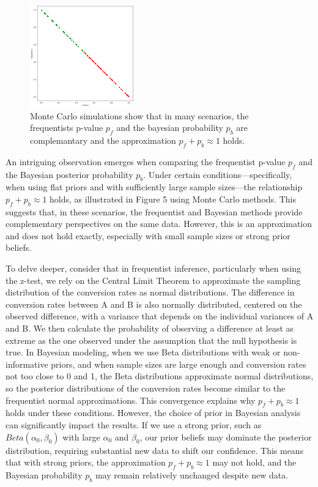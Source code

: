 \documentclass[final,5p,times,twocolumn,authoryear]{elsarticle}
\begin{document}
\begin{figure}[h]
  \centering 
  \includegraphics[width=0.4\textwidth]{fig-5.png}  
  \caption{Monte Carlo simulations show that in many scenarios, the frequentists p-value $p_f$ and the bayesian probability $p_b$ are complemantary and the approximation  $ p_f + p_b \approx 1 $ holds.} 
\end{figure}

An intriguing observation emerges when comparing the frequentist p-value $ p_f $ and the Bayesian posterior probability $ p_b $. Under certain conditions—specifically, when using flat priors and with sufficiently large sample sizes—the relationship $ p_f + p_b \approx 1 $ holds, as illustrated in Figure 5 using Monte Carlo methods. This suggests that, in these scenarios, the frequentist and Bayesian methods provide complementary perspectives on the same data. However, this is an approximation and does not hold exactly, especially with small sample sizes or strong prior beliefs.

To delve deeper, consider that in frequentist inference, particularly when using the z-test, we rely on the Central Limit Theorem to approximate the sampling distribution of the conversion rates as normal distributions. The difference in conversion rates between A and B is also normally distributed, centered on the observed difference, with a variance that depends on the individual variances of A and B. We then calculate the probability of observing a difference at least as extreme as the one observed under the assumption that the null hypothesis is true. In Bayesian modeling, when we use Beta distributions with weak or non-informative priors, and when sample sizes are large enough and conversion rates not too close to 0 and 1, the Beta distributions approximate normal distributions, so the posterior distributions of the conversion rates become similar to the frequentist normal approximations. This convergence explains why $ p_f + p_b \approx 1 $ holds under these conditions. However, the choice of prior in Bayesian analysis can significantly impact the results. If we use a strong prior, such as $ Beta(\alpha_0, \beta_0) $ with large $ \alpha_0 $ and $ \beta_0 $, our prior beliefs may dominate the posterior distribution, requiring substantial new data to shift our confidence. This means that with strong priors, the approximation $ p_f + p_b \approx 1 $ may not hold, and the Bayesian probability $ p_b $ may remain relatively unchanged despite new data.
\end{document}
